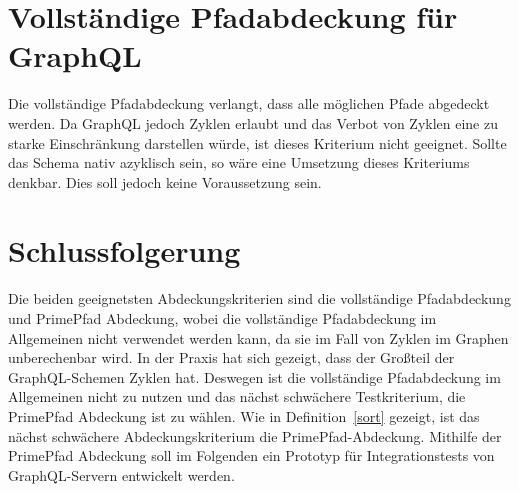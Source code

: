 \section{Vollständige Pfadabdeckung für GraphQL}

Die vollständige Pfadabdeckung verlangt, dass alle möglichen Pfade abgedeckt werden.
Da GraphQL jedoch Zyklen erlaubt und das Verbot von Zyklen eine zu starke Einschränkung darstellen würde, ist dieses Kriterium nicht geeignet.
Sollte das Schema nativ azyklisch sein, so wäre eine Umsetzung dieses Kriteriums denkbar.
Dies soll jedoch keine Voraussetzung sein.

\section{Schlussfolgerung}
\label{fazitcov}

Die beiden geeignetsten Abdeckungskriterien sind die vollständige Pfadabdeckung und PrimePfad Abdeckung, wobei die vollständige Pfadabdeckung im
Allgemeinen nicht verwendet werden kann, da sie im Fall von Zyklen im Graphen unberechenbar wird.
In der Praxis hat sich gezeigt, dass der Großteil der GraphQL-Schemen Zyklen hat.
Deswegen ist die vollständige Pfadabdeckung im Allgemeinen nicht zu nutzen und das nächst schwächere Testkriterium, die PrimePfad Abdeckung ist zu wählen.
Wie in Definition~\ref{sort} gezeigt, ist das nächst schwächere Abdeckungskriterium die PrimePfad-Abdeckung.
Mithilfe der PrimePfad Abdeckung soll im Folgenden ein Prototyp für Integrationstests von GraphQL-Servern entwickelt werden.





